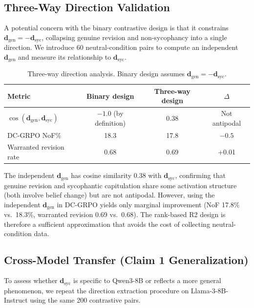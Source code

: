 \documentclass[11pt]{article}
\begin{document}
\subsection{Three-Way Direction Validation}
\label{sec:three_way}

A potential concern with the binary contrastive design is that it constrains $\mathbf{d}_\text{gen} = -\mathbf{d}_\text{syc}$, collapsing genuine revision and non-sycophancy into a single direction. We introduce 60 neutral-condition pairs to compute an independent $\mathbf{d}_\text{gen}$ and measure its relationship to $\mathbf{d}_\text{syc}$.

\begin{table}[h]
\centering
\caption{Three-way direction analysis. Binary design assumes $\mathbf{d}_\text{gen} = -\mathbf{d}_\text{syc}$.}
\label{tab:three_way}
\begin{tabular}{lccc}
\toprule
Metric & Binary design & Three-way design & $\Delta$ \\
\midrule
$\cos(\mathbf{d}_\text{gen}, \mathbf{d}_\text{syc})$ & $-1.0$ (by definition) & 0.38 & Not antipodal \\
DC-GRPO NoF\% & 18.3 & 17.8 & $-0.5$ \\
Warranted revision rate & 0.68 & 0.69 & +0.01 \\
\bottomrule
\end{tabular}
\end{table}

The independent $\mathbf{d}_\text{gen}$ has cosine similarity 0.38 with $\mathbf{d}_\text{syc}$, confirming that genuine revision and sycophantic capitulation share some activation structure (both involve belief change) but are not antipodal. However, using the independent $\mathbf{d}_\text{gen}$ in DC-GRPO yields only marginal improvement (NoF 17.8\% vs.\ 18.3\%, warranted revision 0.69 vs.\ 0.68). The rank-based R2 design is therefore a sufficient approximation that avoids the cost of collecting neutral-condition data.

\subsection{Cross-Model Transfer (Claim 1 Generalization)}
\label{sec:cross_model}

To assess whether $\mathbf{d}_\text{syc}$ is specific to Qwen3-8B or reflects a more general phenomenon, we repeat the direction extraction procedure on Llama-3-8B-Instruct using the same 200 contrastive pairs.
\end{document}
